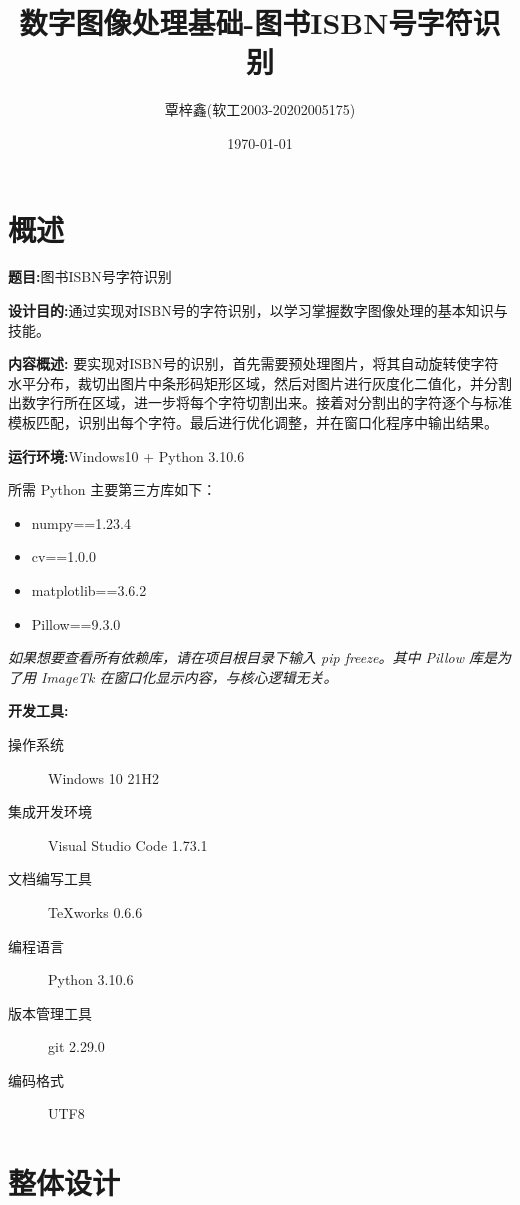 \documentclass{ctexart}
\begin{document}
\title{数字图像处理基础-图书ISBN号字符识别}
\author{覃梓鑫(软工2003-20202005175)}
\date{\today}
\maketitle
\tableofcontents
\newpage
\section{概述}

\textbf{题目:}图书ISBN号字符识别

\textbf{设计目的:}通过实现对ISBN号的字符识别，以学习掌握数字图像处理的基本知识与技能。

\textbf{内容概述:}
要实现对ISBN号的识别，首先需要预处理图片，将其自动旋转使字符水平分布，裁切出图片中条形码矩形区域，然后对图片进行灰度化二值化，并分割出数字行所在区域，进一步将每个字符切割出来。接着对分割出的字符逐个与标准模板匹配，识别出每个字符。最后进行优化调整，并在窗口化程序中输出结果。

\textbf{运行环境:}Windows10 + Python 3.10.6

所需 Python 主要第三方库如下：
\begin{itemize}
    \item numpy==1.23.4
    \item cv==1.0.0
    \item matplotlib==3.6.2
    \item Pillow==9.3.0
\end{itemize}

\textit{如果想要查看所有依赖库，请在项目根目录下输入 pip freeze。其中 Pillow 库是为了用 ImageTk 在窗口化显示内容，与核心逻辑无关。}

\textbf{开发工具:}%
\begin{description}
    \item[操作系统] Windows 10 21H2
    \item[集成开发环境] Visual Studio Code 1.73.1
    \item[文档编写工具] TeXworks 0.6.6
    \item[编程语言] Python 3.10.6
    \item[版本管理工具] git 2.29.0
    \item[编码格式] UTF8
\end{description}

\section{整体设计}
\end{document}
